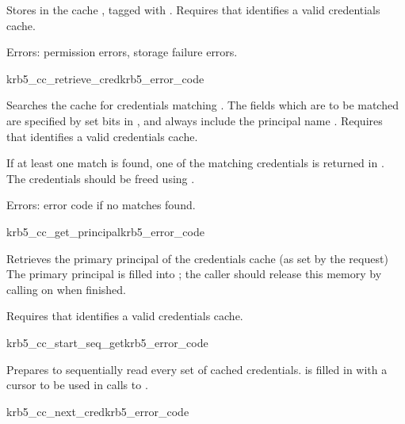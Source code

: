 Stores  in the cache , tagged with
.
Requires that  identifies a valid credentials cache.

Errors: permission errors, storage failure errors.

\begin{funcdecl}{krb5_cc_retrieve_cred}{krb5_error_code}{\funcinout}
\funcin
{}
\funcout
{}
\end{funcdecl}

Searches the cache  for credentials matching
.  The fields which are to be matched are specified by
set bits in , and always include the principal
name .
Requires that  identifies a valid credentials cache.

If at least one match is found, one of the matching credentials is
returned in . The credentials should be freed using
.

Errors: error code if no matches found.

\begin{funcdecl}{krb5_cc_get_principal}{krb5_error_code}{\funcinout}
\funcin
{}
\end{funcdecl}

Retrieves the primary principal of the credentials cache (as
set by the  request)
The primary principal is filled into ; the caller
should release this memory by calling  on
 when finished.

Requires that  identifies a valid credentials cache.

\begin{funcdecl}{krb5_cc_start_seq_get}{krb5_error_code}{\funcinout}
\funcout
{}
\end{funcdecl}

Prepares to sequentially read every set of cached credentials.
 is filled in with a cursor to be used in calls to
.

\begin{funcdecl}{krb5_cc_next_cred}{krb5_error_code}{\funcinout}
\funcout
{}
\funcinout
{}
\end{funcdecl}

